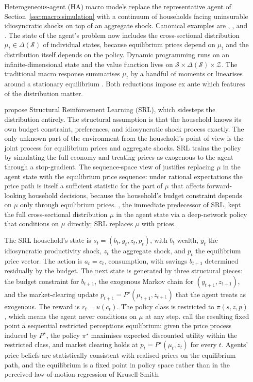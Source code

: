 Heterogeneous-agent (HA) macro models replace the representative
agent of Section~\ref{sec:macro:simulation} with a continuum of
households facing uninsurable idiosyncratic shocks on top of an
aggregate shock. Canonical examples are \citet{Aiyagari1994},
\citet{KrusellSmith1998}, and \citet{KaplanMollViolante2018}. The
state of the agent's problem now includes the cross-sectional
distribution $\mu_t \in \Delta(\mathcal S)$ of individual states,
because equilibrium prices depend on $\mu_t$ and the distribution
itself depends on the policy. Dynamic programming runs on an
infinite-dimensional state and the value function lives on
$\mathcal S \times \Delta(\mathcal S) \times \mathcal Z$. The
traditional macro response summarises $\mu_t$ by a handful of moments
\citep{KrusellSmith1998} or linearises around a stationary
equilibrium \citep{Reiter2009, Auclert2021}. Both reductions impose
ex ante which features of the distribution matter.

\citet{Yang2025srl} propose Structural Reinforcement Learning (SRL),
which sidesteps the distribution entirely. The structural assumption
is that the household knows its own budget constraint, preferences,
and idiosyncratic shock process exactly. The only unknown part of
the environment from the household's point of view is the joint
process for equilibrium prices and aggregate shocks. SRL trains the
policy by simulating the full economy and treating prices as
exogenous to the agent through a stop-gradient. The sequence-space
view of \citet{Auclert2021} justifies replacing $\mu$ in the agent
state with the equilibrium price sequence: under rational
expectations the price path is itself a sufficient statistic for the
part of $\mu$ that affects forward-looking household decisions,
because the household's budget constraint depends on $\mu$ only
through equilibrium prices. \citet{Han2022deepham}, the immediate
predecessor of SRL, kept the full cross-sectional distribution $\mu$
in the agent state via a deep-network policy that conditions on
$\mu$ directly; SRL replaces $\mu$ with prices.

The SRL household's state is
$s_t = (b_t, y_t, z_t, p_t)$, with $b_t$ wealth, $y_t$ the
idiosyncratic productivity shock, $z_t$ the aggregate shock, and
$p_t$ the equilibrium price vector. The action is $a_t = c_t$,
consumption, with savings $b_{t+1}$ determined residually by the
budget. The next state is generated by three structural pieces: the
budget constraint for $b_{t+1}$, the exogenous Markov chain for
$(y_{t+1}, z_{t+1})$, and the market-clearing update $p_{t+1} =
P^\star(\mu_{t+1}, z_{t+1})$ that the agent treats as exogenous. The
reward is $r_t = u(c_t)$. The policy class is restricted to
$\pi(s, z, p)$, which means the agent never conditions on $\mu$ at
any step. \citet{Yang2025srl} call the resulting fixed point a
sequential restricted perceptions equilibrium: given the price
process induced by $P^\star$, the policy $\pi^\star$ maximises
expected discounted utility within the restricted class, and market
clearing holds at $p_t = P^\star(\mu_t, z_t)$ for every $t$. Agents'
price beliefs are statistically consistent with realised prices on
the equilibrium path, and the equilibrium is a fixed point in policy
space rather than in the perceived-law-of-motion regression of
Krusell-Smith.

